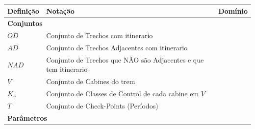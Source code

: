 \begin{table}[h]
	\centering
	\small
	\begin{tabular}{p{2cm} p{9.5cm} p{3.2cm}}
		\toprule
		\textbf{Definição} & \textbf{Notação}                                                                                                                                                       & \textbf{Domínio}                             \\ \midrule
		\multicolumn{3}{l}{\textbf{Conjuntos}}                                                                                                                                                                                                     \\ \midrule
		$OD$               & Conjunto de Trechos com itinerario                                                                                                                                     &                                              \\
		$AD$               & Conjunto de Trechos Adjacentes com itinerario                                                                                                                          &                                              \\
		$NAD$              & Conjunto de Trechos que NÃO são Adjacentes e que tem itinerario                                                                                                        &                                              \\
		$V$                & Conjunto de Cabines do trem                                                                                                                                            &                                              \\
		$K_v$              & Conjunto de Classes de Control de cada cabine em $V$                                                                                                                   &                                              \\
		$T$                & Conjunto de Check-Points (Períodos)                                                                                                                                    &                                              \\ \midrule
		\multicolumn{3}{l}{\textbf{Parâmetros}}                                                                                                                                                                                                    \\ \midrule

\end{tabular}
\end{table}
